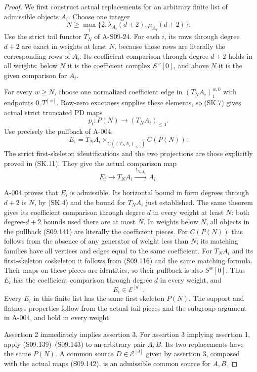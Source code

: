 \begin{proof}
We first construct actual replacements for an arbitrary
finite list of admissible objects $A_i$.  Choose one
integer
\[
 N\geq\max_i\{2,\lambda_{A_i}(d+2),
                         \mu_{A_i}(d+2)\}.
 \tag{S09.139}
\]
Use the strict tail functor $T_N$ of A-S09-24.
For each $i$, its rows through degree $d+2$ are
exact in weights at least $N$, because those rows
are literally the corresponding rows of $A_i$.
Its coefficient comparison through degree $d+2$
holds in all weights: below $N$ it is the coefficient
complex $S^w[0]$, and above $N$ it is the given
comparison for $A_i$.

For every $w\geq N$, choose one normalized coefficient
edge in $(T_NA_i)_1^{w,0}$ with endpoints $0,T^{[w]}$.
Row-zero exactness supplies these elements, so (SK.7)
gives actual strict truncated PD maps
\[
                      p_i:P(N)\longrightarrow (T_NA_i)_{\leq1}.
 \tag{S09.140}
\]
Use precisely the pullback of A-004:
\[
 E_i=T_NA_i\mathop{\times}_{C((T_NA_i)_{\leq1})}C(P(N)).
 \tag{S09.141}
\]
The strict first-skeleton identifications and the two
projections are those explicitly proved in (SK.11).
They give the actual comparison map
\[
             E_i\longrightarrow T_NA_i
                          \xrightarrow{\ t_{N,A_i}\ }A_i.
 \tag{S09.142}
\]

A-004 proves that $E_i$ is admissible.  Its horizontal
bound in form degrees through $d+2$ is $N$, by (SK.4)
and the bound for $T_NA_i$ just established.
The same theorem gives its coefficient comparison
through degree $d$ in every weight at least $N$:
both degree-$d+2$ bounds used there are at most $N$.
In weights below $N$, all objects in the pullback
(S09.141) are literally the coefficient pieces.
For $C(P(N))$ this follows from the absence of any
generator of weight less than $N$; its matching
families have all vertices and edges equal to the
same coefficient.  For $T_NA_i$ and its first-skeleton
coskeleton it follows from (S09.116) and the same
matching formula.  Their maps on these pieces are
identities, so their pullback is also $S^w[0]$.
Thus $E_i$ has the coefficient comparison through
degree $d$ in every weight, and
\[
                         E_i\in\mathcal E^{[d]}.
 \tag{S09.143}
\]
Every $E_i$ in this finite list has the same first
skeleton $P(N)$.  The support and flatness properties
follow from the actual tail pieces and the subgroup
argument in A-004, and hold in every weight.

Assertion 2 immediately implies assertion 3.
For assertion 3 implying assertion 1, apply
(S09.139)--(S09.143) to an arbitrary pair $A,B$.
Its two replacements have the same $P(N)$.
A common source $D\in\mathcal E^{[d]}$ given by
assertion 3, composed with the actual maps (S09.142),
is an admissible common source for $A,B$.


\end{proof}
